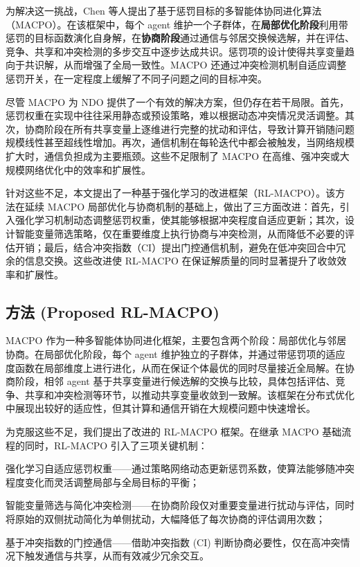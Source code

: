 \documentclass[12pt]{ctexart}
\begin{document}
为解决这一挑战，Chen
等人提出了基于惩罚目标的多智能体协同进化算法（MACPO）。在该框架中，每个
agent
维护一个子群体，在\textbf{局部优化阶段}利用带惩罚的目标函数演化自身解，在\textbf{协商阶段}通过通信与邻居交换候选解，并在评估、竞争、共享和冲突检测的多步交互中逐步达成共识。惩罚项的设计使得共享变量趋向于共识解，从而增强了全局一致性。MACPO
还通过冲突检测机制自适应调整惩罚开关，在一定程度上缓解了不同子问题之间的目标冲突。

尽管 MACPO 为 NDO
提供了一个有效的解决方案，但仍存在若干局限。首先，惩罚权重在实现中往往采用静态或预设策略，难以根据动态冲突情况灵活调整。其次，协商阶段在所有共享变量上逐维进行完整的扰动和评估，导致计算开销随问题规模线性甚至超线性增加。再次，通信机制在每轮迭代中都会被触发，当网络规模扩大时，通信负担成为主要瓶颈。这些不足限制了
MACPO 在高维、强冲突或大规模网络优化中的效率和扩展性。

针对这些不足，本文提出了一种基于强化学习的改进框架（RL-MACPO）。该方法在延续
MACPO
局部优化与协商机制的基础上，做出了三方面改进：首先，引入强化学习机制动态调整惩罚权重，使其能够根据冲突程度自适应更新；其次，设计智能变量筛选策略，仅在重要维度上执行协商与冲突检测，从而降低不必要的评估开销；最后，结合冲突指数（CI）提出门控通信机制，避免在低冲突回合中冗余的信息交换。这些改进使
RL-MACPO 在保证解质量的同时显著提升了收敛效率和扩展性。

\subsection{方法 (Proposed
RL-MACPO)}\label{ux65b9ux6cd5-proposed-rl-macpo}

MACPO
作为一种多智能体协同进化框架，主要包含两个阶段：局部优化与邻居协商。在局部优化阶段，每个
agent
维护独立的子群体，并通过带惩罚项的适应度函数在局部维度上进行进化，从而在保证个体最优的同时尽量接近全局解。在协商阶段，相邻
agent
基于共享变量进行候选解的交换与比较，具体包括评估、竞争、共享和冲突检测等环节，以推动共享变量收敛到一致解。该框架在分布式优化中展现出较好的适应性，但其计算和通信开销在大规模问题中快速增长。

为克服这些不足，我们提出了改进的 RL-MACPO 框架。在继承 MACPO
基础流程的同时，RL-MACPO 引入了三项关键机制：

强化学习自适应惩罚权重------通过策略网络动态更新惩罚系数，使算法能够随冲突程度变化而灵活调整局部与全局目标的平衡；

智能变量筛选与简化冲突检测------在协商阶段仅对重要变量进行扰动与评估，同时将原始的双侧扰动简化为单侧扰动，大幅降低了每次协商的评估调用次数；

基于冲突指数的门控通信------借助冲突指数 (CI)
判断协商必要性，仅在高冲突情况下触发通信与共享，从而有效减少冗余交互。
\end{document}
